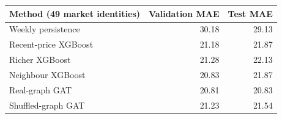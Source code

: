 \begin{tabular}{lrr}
\toprule
Method (49 market identities) & Validation MAE & Test MAE \\
\midrule
Weekly persistence & 30.18 & 29.13 \\
Recent-price XGBoost & 21.18 & 21.87 \\
Richer XGBoost & 21.28 & 22.13 \\
Neighbour XGBoost & 20.83 & 21.87 \\
Real-graph GAT & 20.81 & 20.83 \\
Shuffled-graph GAT & 21.23 & 21.54 \\
\bottomrule
\end{tabular}
